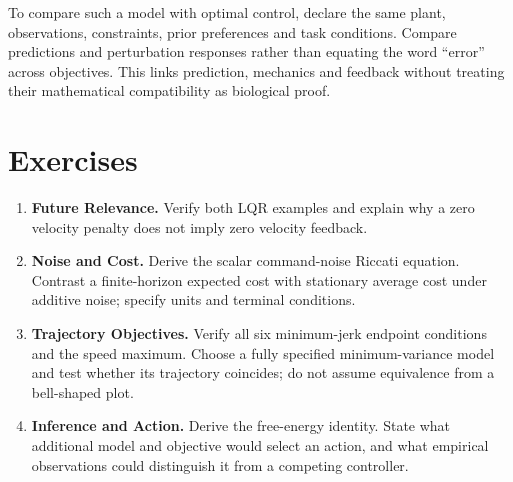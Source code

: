 To compare such a model with optimal control, declare the same plant,
observations, constraints, prior preferences and task conditions. Compare
predictions and perturbation responses rather than equating the word
``error'' across objectives. This links prediction, mechanics and feedback
without treating their mathematical compatibility as biological proof.

\section*{Exercises}
\begin{enumerate}
 \item \textbf{Future Relevance.} Verify both LQR examples and explain
 why a zero velocity penalty does not imply zero velocity feedback.
 \item \textbf{Noise and Cost.} Derive the scalar command-noise Riccati
 equation. Contrast a finite-horizon expected cost with stationary average
 cost under additive noise; specify units and terminal conditions.
 \item \textbf{Trajectory Objectives.} Verify all six minimum-jerk
 endpoint conditions and the speed maximum. Choose a fully specified
 minimum-variance model and test whether its trajectory coincides; do not
 assume equivalence from a bell-shaped plot.
 \item \textbf{Inference and Action.} Derive the free-energy identity.
 State what additional model and objective would select an action, and what
 empirical observations could distinguish it from a competing controller.
\end{enumerate}

